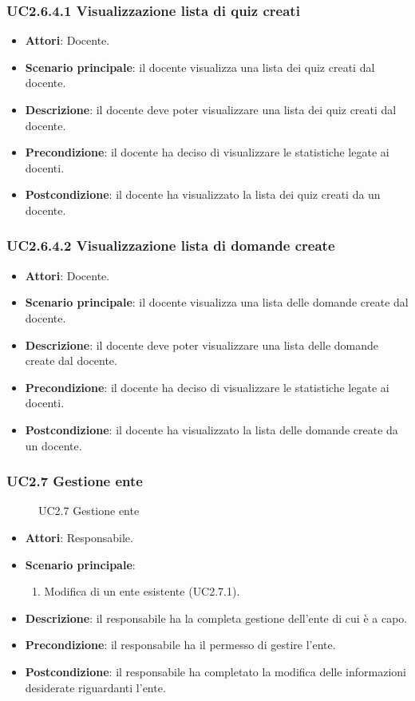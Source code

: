 \subsubsection{UC2.6.4.1 Visualizzazione lista di quiz creati}
\begin{itemize}
\item \textbf{Attori}: Docente.
\item \textbf{Scenario principale}: il docente visualizza una lista dei quiz creati dal docente.
\item \textbf{Descrizione}: il docente deve poter visualizzare una lista dei quiz creati dal docente.
\item \textbf{Precondizione}: il docente ha deciso di visualizzare le statistiche legate ai docenti.
\item \textbf{Postcondizione}: il docente ha visualizzato la lista dei quiz creati da un docente.
\end{itemize}
\subsubsection{UC2.6.4.2 Visualizzazione lista di domande create}
\begin{itemize}
\item \textbf{Attori}: Docente.
\item \textbf{Scenario principale}: il docente visualizza una lista delle domande create dal docente.
\item \textbf{Descrizione}: il docente deve poter visualizzare una lista delle domande create dal docente.
\item \textbf{Precondizione}: il docente ha deciso di visualizzare le statistiche legate ai docenti.
\item \textbf{Postcondizione}: il docente ha visualizzato la lista delle domande create da un docente.
\end{itemize}
\subsubsection{UC2.7 Gestione ente}
\begin{figure}[H]
\centering
\noindent{}
\caption{UC2.7 Gestione ente}
\end{figure}
\begin{itemize}
\item \textbf{Attori}: Responsabile.
\item \textbf{Scenario principale}:
\begin{enumerate}
\item Modifica di un ente esistente (UC2.7.1).
\end{enumerate}
\item \textbf{Descrizione}: il responsabile ha la completa gestione dell'ente di cui è a capo.
\item \textbf{Precondizione}: il responsabile ha il permesso di gestire l'ente.
\item \textbf{Postcondizione}: il responsabile ha completato la modifica delle informazioni desiderate riguardanti l'ente.
\end{itemize}
